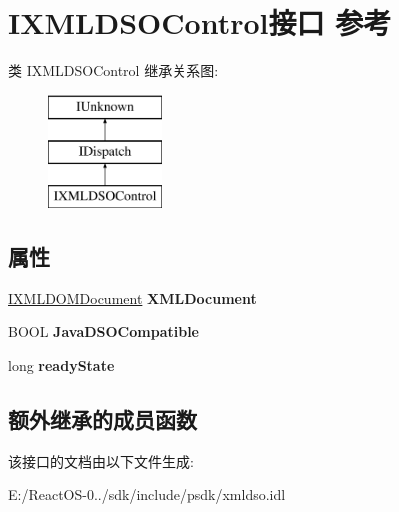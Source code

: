 \hypertarget{interface_i_x_m_l_d_s_o_control}{}\section{I\+X\+M\+L\+D\+S\+O\+Control接口 参考}
\label{interface_i_x_m_l_d_s_o_control}
类 I\+X\+M\+L\+D\+S\+O\+Control 继承关系图\+:\begin{figure}[H]
\begin{center}
\leavevmode
\includegraphics[height=3.000000cm]{interface_i_x_m_l_d_s_o_control}
\end{center}
\end{figure}
\subsection*{属性}
\begin{DoxyCompactItemize}
\item 
\mbox{\label{interface_i_x_m_l_d_s_o_control_aec2f953f94d7c0d9a34ec6235763ec9b}} 
\hyperlink{interface_i_x_m_l_d_o_m_document}{I\+X\+M\+L\+D\+O\+M\+Document} {\bfseries X\+M\+L\+Document}
\item 
\mbox{\label{interface_i_x_m_l_d_s_o_control_a26e9b61d41021d040d7b6dc181d56cb5}} 
B\+O\+OL {\bfseries Java\+D\+S\+O\+Compatible}
\item 
\mbox{\label{interface_i_x_m_l_d_s_o_control_a4819dd7eec426426e4035248eb7bb243}} 
long {\bfseries ready\+State}
\end{DoxyCompactItemize}
\subsection*{额外继承的成员函数}


该接口的文档由以下文件生成\+:\begin{DoxyCompactItemize}
\item 
E\+:/\+React\+O\+S-\/0../sdk/include/psdk/xmldso.\+idl\end{DoxyCompactItemize}
